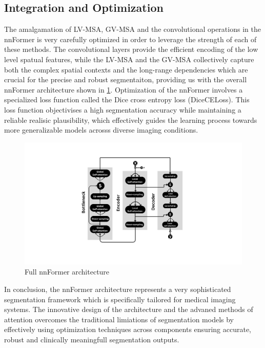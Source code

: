 \subsection{Integration and Optimization}
The amalgamation of LV-MSA, GV-MSA and the convolutional operations in the nnFormer is very carefully optimized in order to leverage the strength of each of these methods. The convolutional layers provide the efficient encoding of the low level spatual features, while the LV-MSA and the GV-MSA collectively capture both the complex spatial contexts and the long-range dependencies which are crucial for the precise and robust segmentaiton, providing us with the overall nnFormer architecture shown in \cref{Fig:nnformer}. Optimization of the nnFormer involves a specialized loss function called the Dice cross entropy loss (DiceCELoss). This loss function objectivises a high segmentation accuracy while maintaining a reliable realisic plausibility, which effectively guides the learning process towards more generalizable models acrosss diverse imaging conditions.

\begin{figure}[htb!]  
    \centering
	\centering
	\includegraphics[width=1\textwidth]{images/Architecture.png}
	\caption{\centering Full nnFormer architecture}
	\label{Fig:nnformer}
\end{figure}

In conclusion, the nnFormer architecture represents a very sophisticated segmentation framework which is specifically tailored for medical imaging systems. The innovative design of the architecture and the advaned methods of attention overcomes the traditional limiations of segmentation models by effectively using optimization techniques across components ensuring accurate, robust and clinically meaningfull segmentation outputs.

